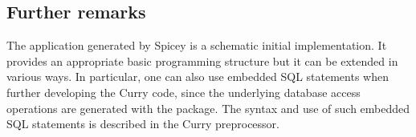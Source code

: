 \subsection{Further remarks}

The application generated by Spicey is a schematic initial implementation.
It provides an appropriate basic programming structure but
it can be extended in various ways.
In particular, one can also use embedded SQL statements when
further developing the Curry code, since the underlying database
access operations are generated with the  package.
The syntax and use of such embedded SQL statements
is described in the Curry preprocessor.
